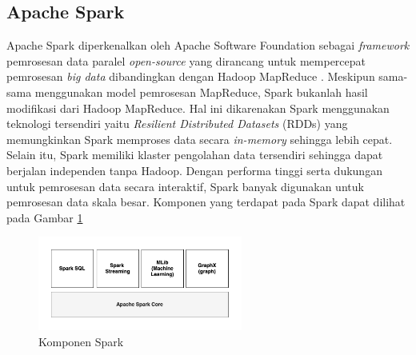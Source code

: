\subsection{Apache Spark}
Apache Spark diperkenalkan oleh Apache Software Foundation sebagai \textit{framework} pemrosesan data paralel \textit{open-source} yang dirancang untuk mempercepat pemrosesan \textit{big data} dibandingkan dengan  Hadoop MapReduce \cite{ApacheSparkUnified}. Meskipun sama-sama menggunakan model pemrosesan MapReduce, Spark bukanlah hasil modifikasi dari Hadoop MapReduce\cite{KOMPARASIKECEPATANHADOOP}. Hal ini dikarenakan Spark menggunakan teknologi tersendiri yaitu \textit{Resilient Distributed Datasets} (RDDs) yang memungkinkan Spark memproses data secara \textit{in-memory} sehingga lebih cepat. Selain itu, Spark memiliki klaster pengolahan data tersendiri sehingga dapat berjalan independen tanpa Hadoop. Dengan performa tinggi serta dukungan untuk pemrosesan data secara interaktif, Spark banyak digunakan untuk pemrosesan data skala besar. Komponen yang terdapat pada Spark dapat dilihat pada Gambar \ref{fig:spark-component}

\begin{figure}[h]
    \centering
    \includegraphics[width=0.6\textwidth]{figures/ch02/spark-contain}
    \caption{Komponen Spark}
    \label{fig:spark-component}
\end{figure}


